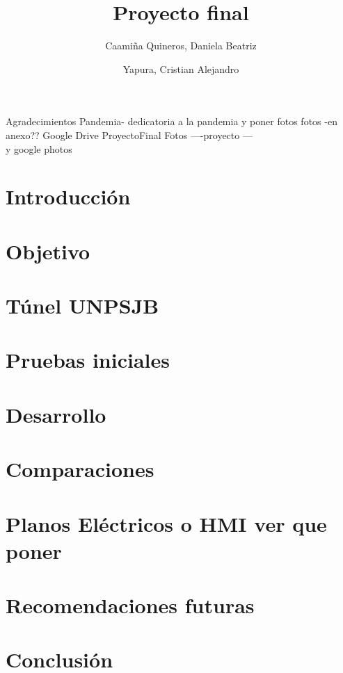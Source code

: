 \documentclass[12pt,a4paper]{article}
\author{Caamiña Quineros, Daniela Beatriz\\ \and Yapura, Cristian Alejandro}
\title{Proyecto final}
\begin{document}
	\maketitle
\newpage
	Agradecimientos
\newpage
Pandemia- dedicatoria a la pandemia y poner fotos
fotos -en  anexo??
Google Drive ProyectoFinal Fotos ----proyecto ---\\
y google photos
	\newpage
	\tableofcontents
	\newpage
	\listoffigures
	\newpage
	\listoftables
	\newpage


	\section{Introducción}
	

	\section{Objetivo}
	

	\section{Túnel UNPSJB}
		

	\section{Pruebas iniciales}
	

	\section{Desarrollo}
	

	\section{Comparaciones}

	\section{Planos Eléctricos o HMI ver que poner} 
	
	
	\section{Recomendaciones futuras}
	

	\section{Conclusión}
	
	
\end{document}
